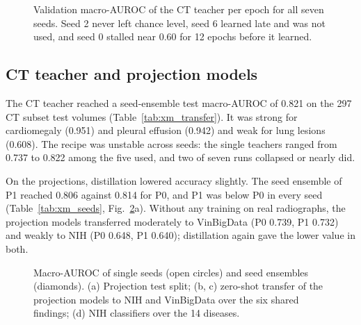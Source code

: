 \begin{figure}[htbp]
\centering
{}
\caption{Validation macro-AUROC of the CT teacher per epoch for all seven seeds. Seed 2 never left chance level, seed 6 learned late and
was not used, and seed 0 stalled near 0.60 for 12 epochs before it learned.}
\label{fig:xm_ct_training}
\end{figure}

\subsection{CT teacher and projection models}
\label{sec:xm_res_transfer}
The CT teacher reached a seed-ensemble test macro-AUROC of 0.821 on the 297 CT subset test volumes (Table~\ref{tab:xm_transfer}). It was
strong for cardiomegaly (0.951) and pleural effusion (0.942) and weak for lung lesions (0.608). The recipe was unstable across seeds: the
single teachers ranged from 0.737 to 0.822 among the five used, and two of seven runs collapsed or nearly did.

On the projections, distillation lowered accuracy slightly. The seed ensemble of P1 reached 0.806 against 0.814 for P0, and P1 was below
P0 in every seed (Table~\ref{tab:xm_seeds}, Fig.~\ref{fig:xm_transfer}a). Without any training on real radiographs, the projection
models transferred moderately to VinBigData (P0 0.739, P1 0.732) and weakly to NIH (P0 0.648, P1 0.640); distillation again gave the
lower value in both.

\begin{table}[htbp]
\centering\small
\caption{CT teacher, projection models and their zero-shot transfer: test AUROC of the seed ensembles over the six findings, with the
macro-average (descriptive). NIH lung opacity is the approximate mapping to Infiltration.}
\label{tab:xm_transfer}
\end{table}

\begin{table}[htbp]
\centering\small
\caption{Test macro-AUROC of every single model (one seed each); the other tables use the seed ensembles. Projection models and zero-shot
transfer: six findings; NIH classifiers: 14 diseases.}
\label{tab:xm_seeds}
\end{table}

\begin{figure}[htbp]
\centering
{}
\caption{Macro-AUROC of single seeds (open circles) and seed ensembles (diamonds). (a) Projection test split; (b, c) zero-shot transfer
of the projection models to NIH and VinBigData over the six shared findings; (d) NIH classifiers over the 14 diseases.}
\label{fig:xm_transfer}
\end{figure}

